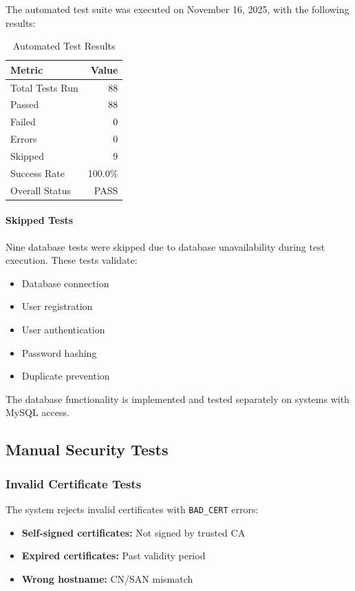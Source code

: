\documentclass[runningheads]{llncs}
\begin{document}
The automated test suite was executed on November 16, 2025, with the following results:

\begin{table}[h]
\centering
\begin{tabular}{@{}lr@{}}
\toprule
\textbf{Metric} & \textbf{Value} \\
\midrule
Total Tests Run & 88 \\
Passed & 88 \\
Failed & 0 \\
Errors & 0 \\
Skipped & 9 \\
Success Rate & 100.0\% \\
Overall Status & PASS \\
\bottomrule
\end{tabular}
\caption{Automated Test Results}
\label{tab:test-results}
\end{table}

\paragraph{Skipped Tests}

Nine database tests were skipped due to database unavailability during test execution. These tests validate:
\begin{itemize}
    \item Database connection
    \item User registration
    \item User authentication
    \item Password hashing
    \item Duplicate prevention
\end{itemize}

The database functionality is implemented and tested separately on systems with MySQL access.

\subsection{Manual Security Tests}

\subsubsection{Invalid Certificate Tests}

The system rejects invalid certificates with \texttt{BAD\_CERT} errors:
\begin{itemize}
    \item \textbf{Self-signed certificates:} Not signed by trusted CA
    \item \textbf{Expired certificates:} Past validity period
    \item \textbf{Wrong hostname:} CN/SAN mismatch
\end{itemize}
\end{document}
